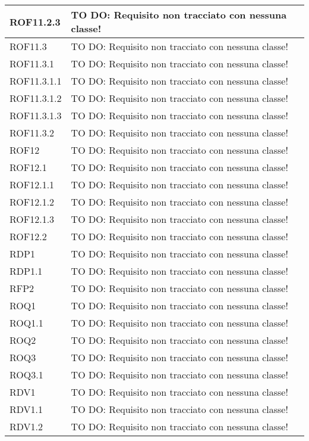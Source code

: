 \begin{center}
\begin{longtable}{| p{2.5cm} | p{11cm} |}
\hline
ROF11.2.3 & TO DO: Requisito non tracciato con nessuna classe! \\
\hline
ROF11.3 & TO DO: Requisito non tracciato con nessuna classe! \\
\hline
ROF11.3.1 & TO DO: Requisito non tracciato con nessuna classe! \\
\hline
ROF11.3.1.1 & TO DO: Requisito non tracciato con nessuna classe! \\
\hline
ROF11.3.1.2 & TO DO: Requisito non tracciato con nessuna classe! \\
\hline
ROF11.3.1.3 & TO DO: Requisito non tracciato con nessuna classe! \\
\hline
ROF11.3.2 & TO DO: Requisito non tracciato con nessuna classe! \\
\hline
ROF12 & TO DO: Requisito non tracciato con nessuna classe! \\
\hline
ROF12.1 & TO DO: Requisito non tracciato con nessuna classe! \\
\hline
ROF12.1.1 & TO DO: Requisito non tracciato con nessuna classe! \\
\hline
ROF12.1.2 & TO DO: Requisito non tracciato con nessuna classe! \\
\hline
ROF12.1.3 & TO DO: Requisito non tracciato con nessuna classe! \\
\hline
ROF12.2 & TO DO: Requisito non tracciato con nessuna classe! \\
\hline
RDP1 & TO DO: Requisito non tracciato con nessuna classe! \\
\hline
RDP1.1 & TO DO: Requisito non tracciato con nessuna classe! \\
\hline
RFP2 & TO DO: Requisito non tracciato con nessuna classe! \\
\hline
ROQ1 & TO DO: Requisito non tracciato con nessuna classe! \\
\hline
ROQ1.1 & TO DO: Requisito non tracciato con nessuna classe! \\
\hline
ROQ2 & TO DO: Requisito non tracciato con nessuna classe! \\
\hline
ROQ3 & TO DO: Requisito non tracciato con nessuna classe! \\
\hline
ROQ3.1 & TO DO: Requisito non tracciato con nessuna classe! \\
\hline
RDV1 & TO DO: Requisito non tracciato con nessuna classe! \\
\hline
RDV1.1 & TO DO: Requisito non tracciato con nessuna classe! \\
\hline
RDV1.2 & TO DO: Requisito non tracciato con nessuna classe! \\

\end{longtable}
\end{center}
